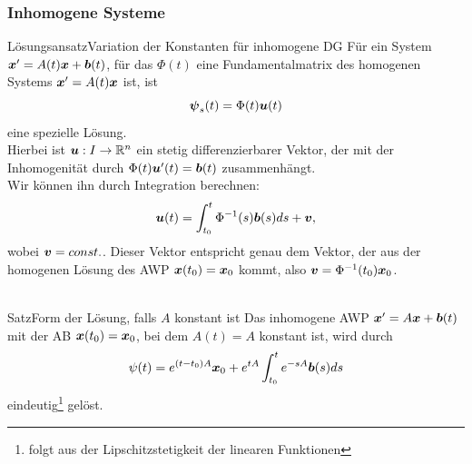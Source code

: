 \subsubsection{Inhomogene Systeme}\label{sssec:12InhomogeneSysteme}
\begin{Satz}
{Lösungsansatz}{Variation der Konstanten für inhomogene DG}
Für ein System ${{\text{\boldmath${x}$}}}'=A(t){{\text{\boldmath${x}$}}} +{{\text{\boldmath${b}$}}}(t)$, für das $\Phi(t)$ eine Fundamentalmatrix des homogenen Systems ${{\text{\boldmath${x}$}}}'=A(t){{\text{\boldmath${x}$}}}$ ist, ist
\begin{equation}\label{eq:12Inhomogenlosung}
    {{\text{\boldmath${\psi}$}}}_s(t)=\Phi(t){{\text{\boldmath${u}$}}}(t)
\end{equation}
eine spezielle Lösung.\\
Hierbei ist ${{\text{\boldmath${u}$}}}:I\to\mathbb{R}^n$ ein stetig differenzierbarer Vektor, der mit der Inhomogenität durch $\Phi(t){{\text{\boldmath${u}$}}}'(t)={{\text{\boldmath${b}$}}}(t)$ zusammenhängt.\\
Wir können ihn durch Integration berechnen:
\begin{equation*}
    {{\text{\boldmath${u}$}}}(t)=\int_{t_0}^t\Phi^{-1}(s){{\text{\boldmath${b}$}}}(s)ds+{{\text{\boldmath${v}$}}},
\end{equation*}
wobei ${{\text{\boldmath${v}$}}}=const.$. Dieser Vektor entspricht genau dem Vektor, der aus der homogenen Lösung des AWP ${{\text{\boldmath${x}$}}}(t_0)={{\text{\boldmath${x}$}}}_0$ kommt, also ${{\text{\boldmath${v}$}}}=\Phi^{-1}(t_0){{\text{\boldmath${x}$}}}_0$.\\
\\
\end{Satz}
\begin{Satz}
{Satz}{Form der Lösung{,} falls $A$ konstant ist}
Das inhomogene AWP ${{\text{\boldmath${x}$}}}'=A{{\text{\boldmath${x}$}}}+{{\text{\boldmath${b}$}}}(t)$ mit der AB ${{\text{\boldmath${x}$}}}(t_0)={{\text{\boldmath${x}$}}}_0$, bei dem $A(t)=A$ konstant ist, wird durch
\begin{equation}
    \psi(t)=e^{(t-t_0)A}{{\text{\boldmath${x}$}}}_0+e^{tA}\int_{t_0}^te^{-sA}{{\text{\boldmath${b}$}}}(s)ds
\end{equation}
eindeutig\footnote{folgt aus der Lipschitzstetigkeit der linearen Funktionen} gelöst.
\end{Satz}

